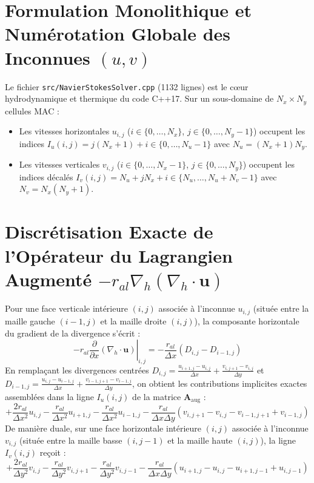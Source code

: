 \documentclass[10pt,a4paper,oneside]{book}
\begin{document}
\section{Formulation Monolithique et Numérotation Globale des Inconnues $(u, v)$}
Le fichier \texttt{src/NavierStokesSolver.cpp} (1132 lignes) est le cœur hydrodynamique et thermique du code C++17. Sur un sous-domaine de $N_x \times N_y$ cellules MAC :
\begin{itemize}
  \item Les vitesses horizontales $u_{i,j}$ ($i \in \{0, \dots, N_x\}$, $j \in \{0, \dots, N_y-1\}$) occupent les indices $I_u(i, j) = j (N_x + 1) + i \in \{0, \dots, N_u - 1\}$ avec $N_u = (N_x + 1) N_y$.
  \item Les vitesses verticales $v_{i,j}$ ($i \in \{0, \dots, N_x-1\}$, $j \in \{0, \dots, N_y\}$) occupent les indices décalés $I_v(i, j) = N_u + j N_x + i \in \{N_u, \dots, N_u + N_v - 1\}$ avec $N_v = N_x (N_y + 1)$.
\end{itemize}

\section{Discrétisation Exacte de l'Opérateur du Lagrangien Augmenté $-r_{al} \nabla_h (\nabla_h \cdot \mathbf{u})$}
Pour une face verticale intérieure $(i, j)$ associée à l'inconnue $u_{i,j}$ (située entre la maille gauche $(i-1, j)$ et la maille droite $(i, j)$), la composante horizontale du gradient de la divergence s'écrit :
\begin{equation}
  -r_{al} \left.\frac{\partial}{\partial x}(\nabla_h \cdot \mathbf{u})\right|_{i,j} = -\frac{r_{al}}{\Delta x} \left( D_{i,j} - D_{i-1,j} \right)
\end{equation}
En remplaçant les divergences centrées $D_{i,j} = \frac{u_{i+1,j} - u_{i,j}}{\Delta x} + \frac{v_{i,j+1} - v_{i,j}}{\Delta y}$ et $D_{i-1,j} = \frac{u_{i,j} - u_{i-1,j}}{\Delta x} + \frac{v_{i-1,j+1} - v_{i-1,j}}{\Delta y}$, on obtient les contributions implicites exactes assemblées dans la ligne $I_u(i,j)$ de la matrice $\mathbf{A}_{\text{aug}}$ :
\begin{equation}
  +\frac{2 r_{al}}{\Delta x^2} u_{i,j} - \frac{r_{al}}{\Delta x^2} u_{i+1,j} - \frac{r_{al}}{\Delta x^2} u_{i-1,j} - \frac{r_{al}}{\Delta x \Delta y} \left( v_{i,j+1} - v_{i,j} - v_{i-1,j+1} + v_{i-1,j} \right)
\end{equation}
De manière duale, sur une face horizontale intérieure $(i, j)$ associée à l'inconnue $v_{i,j}$ (située entre la maille basse $(i, j-1)$ et la maille haute $(i, j)$), la ligne $I_v(i,j)$ reçoit :
\begin{equation}
  +\frac{2 r_{al}}{\Delta y^2} v_{i,j} - \frac{r_{al}}{\Delta y^2} v_{i,j+1} - \frac{r_{al}}{\Delta y^2} v_{i,j-1} - \frac{r_{al}}{\Delta x \Delta y} \left( u_{i+1,j} - u_{i,j} - u_{i+1,j-1} + u_{i,j-1} \right)
\end{equation}
\end{document}

